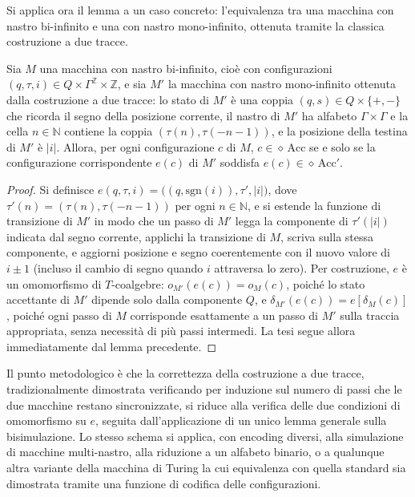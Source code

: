 Si applica ora il lemma a un caso concreto: l'equivalenza tra una macchina con nastro bi-infinito e una con nastro mono-infinito, ottenuta tramite la classica costruzione a due tracce.
 
\begin{proposition}
  Sia \(M\) una macchina con nastro bi-infinito, cioè con configurazioni \((q, \tau, i) \in Q \times \Gamma^{\mathbb{Z}} \times \mathbb{Z}\), e sia \(M'\) la macchina con nastro mono-infinito ottenuta dalla costruzione a due tracce: lo stato di \(M'\) è una coppia \((q, s) \in Q \times \{+,-\}\) che ricorda il segno della posizione corrente, il nastro di \(M'\) ha alfabeto \(\Gamma \times \Gamma\) e la cella \(n \in \mathbb{N}\) contiene la coppia \((\tau(n), \tau(-n-1))\), e la posizione della testina di \(M'\) è \(|i|\). Allora, per ogni configurazione \(c\) di \(M\), \(c \in \diamond\,\mathrm{Acc}\) se e solo se la configurazione corrispondente \(e(c)\) di \(M'\) soddisfa \(e(c) \in \diamond\,\mathrm{Acc}'\).
\end{proposition}
 
\begin{proof}
  Si definisce \(e(q, \tau, i) = \bigl((q, \mathrm{sgn}(i)), \tau', |i|\bigr)\), dove \(\tau'(n) = (\tau(n), \tau(-n-1))\) per ogni \(n \in \mathbb{N}\), e si estende la funzione di transizione di \(M'\) in modo che un passo di \(M'\) legga la componente di \(\tau'(|i|)\) indicata dal segno corrente, applichi la transizione di \(M\), scriva sulla stessa componente, e aggiorni posizione e segno coerentemente con il nuovo valore di \(i \pm 1\) (incluso il cambio di segno quando \(i\) attraversa lo zero). Per costruzione, \(e\) è un omomorfismo di \(T\)-coalgebre: \(o_{M'}(e(c)) = o_M(c)\), poiché lo stato accettante di \(M'\) dipende solo dalla componente \(Q\), e \(\delta_{M'}(e(c)) = e[\delta_M(c)]\), poiché ogni passo di \(M\) corrisponde esattamente a un passo di \(M'\) sulla traccia appropriata, senza necessità di più passi intermedi. La tesi segue allora immediatamente dal lemma precedente.
\end{proof}
 
Il punto metodologico è che la correttezza della costruzione a due tracce, tradizionalmente dimostrata verificando per induzione sul numero di passi che le due macchine restano sincronizzate, si riduce alla verifica delle due condizioni di omomorfismo su \(e\), seguita dall'applicazione di un unico lemma generale sulla bisimulazione. Lo stesso schema si applica, con encoding diversi, alla simulazione di macchine multi-nastro, alla riduzione a un alfabeto binario, o a qualunque altra variante della macchina di Turing la cui equivalenza con quella standard sia dimostrata tramite una funzione di codifica delle configurazioni.
